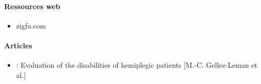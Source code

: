 \paragraph{Ressources web}
  \begin{itemize}
    \item zigfu.com
  \end{itemize}
\paragraph{Articles}
  \begin {itemize}
    \item : Evaluation of the disabilities of hemiplegic patients [M.-C. Gellez-Leman et al.] \label{ref_analyse_litterature}
  \end{itemize}
        